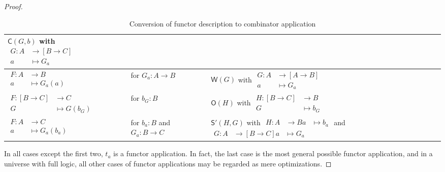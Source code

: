 \documentclass[a4paper]{article}
\theoremstyle{definition}
\theoremstyle{remark}
\newcommand{\nm}{\mathsf}
\newcommand{\combinator}{\nm}
\newcommand{\swapFun}{\combinator{C}}
\newcommand{\dupFun}{\combinator{W}}
\newcommand{\revSelfAppFun}{\combinator{O}}
\newcommand{\substFun}{\combinator{S'}}
\begin{document}
\begin{proof}
\begin{table}
\begin{tabular}{ll|l}
      $\swapFun(G,b)$ with
      $\begin{aligned}
        G : A &\to     [B \to C]\\
            a &\mapsto G_a
      \end{aligned}$\\
      \hline
      \rule{0pt}{2em}
      $\begin{aligned}
        F : A &\to     B\\
            a &\mapsto G_a(a)
      \end{aligned}$ &
      for $G_a : A \to B$ &
      $\dupFun(G)$ with
      $\begin{aligned}
        G : A &\to     [A \to B]\\
            a &\mapsto G_a
      \end{aligned}$\\
      \hline
      \rule{0pt}{2em}
      $\begin{aligned}
        F : [B \to C] &\to     C\\
            G         &\mapsto G(b_G)
      \end{aligned}$ &
      for $b_G : B$ &
      $\revSelfAppFun(H)$ with
      $\begin{aligned}
        H : [B \to C] &\to     B\\
            G         &\mapsto b_G
      \end{aligned}$\\
      \hline
      \rule{0pt}{3em}
      $\begin{aligned}
        F : A &\to     C\\
            a &\mapsto G_a(b_a)
      \end{aligned}$ &
      \parbox{3cm}{for $b_a : B$ \\ and $G_a : B \to C$} &
      \parbox{6cm}{
        $\substFun(H,G)$ with \\[1ex]
        $\begin{aligned}
          H : A &\to     B\\
              a &\mapsto b_a
        \end{aligned}$
        and
        $\begin{aligned}
          G : A &\to     [B \to C]\\
              a &\mapsto G_a
        \end{aligned}$
      }
    \end{tabular}
    \caption{Conversion of functor description to combinator application}
    \label{tbl:layer1-functoriality}
  \end{table}

  In all cases except the first two, $t_a$ is a functor application. In fact, the last case is the
  most general possible functor application, and in a universe with full logic, all other cases of
  functor applications may be regarded as mere optimizations.
\end{proof}
\end{document}
